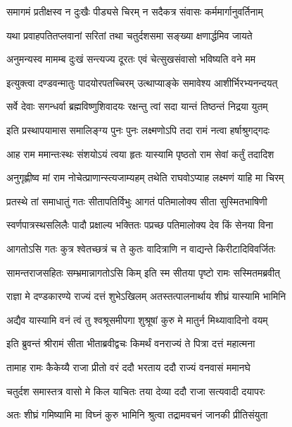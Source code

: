 \twolineshloka
{समागमं प्रतीक्षस्व न दुःखैः पीड्यसे चिरम्}
{न सदैकत्र संवासः कर्ममार्गानुवर्तिनाम्} %

\twolineshloka
{यथा प्रवाहपतितप्लवानां सरितां तथा}
{चतुर्दशसमा सङ्ख्या क्षणार्द्धमिव जायते} %

\twolineshloka
{अनुमन्यस्व मामम्ब दुःखं सन्त्यज्य दूरतः}
{एवं चेत्सुखसंवासो भविष्यति वने मम} %

\twolineshloka
{इत्युक्त्वा दण्डवन्मातुः पादयोरपतच्चिरम्}
{उत्थाप्याङ्के समावेश्य आशीर्भिरभ्यनन्दयत्} %

\twolineshloka
{सर्वे देवाः सगन्धर्वा ब्रह्मविष्णुशिवादयः}
{रक्षन्तु त्वां सदा यान्तं तिष्ठन्तं निद्रया युतम्} %

\twolineshloka
{इति प्रस्थापयामास समालिङ्ग्य पुनः पुनः}
{लक्ष्मणोऽपि तदा रामं नत्वा हर्षाश्रुगद्गदः} %

\twolineshloka
{आह राम ममान्तःस्थः संशयोऽयं त्वया हृतः}
{यास्यामि पृष्ठतो राम सेवां कर्तुं तदादिश} %

\twolineshloka
{अनुगृह्णीष्व मां राम नोचेत्प्राणान्स्त्यजाम्यहम्}
{तथेति राघवोऽप्याह लक्ष्मणं याहि मा चिरम्} %

\twolineshloka
{प्रतस्थे तां समाधातुं गतः सीतापतिर्विभुः}
{आगतं पतिमालोक्य सीता सुस्मितभाषिणी} %

\twolineshloka
{स्वर्णपात्रस्थसलिलैः पादौ प्रक्षाल्य भक्तितः}
{पप्रच्छ पतिमालोक्य देव किं सेनया विना} %

\twolineshloka
{आगतोऽसि गतः कुत्र श्वेतच्छत्रं च ते कुतः}
{वादित्राणि न वाद्यन्ते किरीटादिविवर्जितः} %

\twolineshloka
{सामन्तराजसहितः सम्भ्रमान्नागतोऽसि किम्}
{इति स्म सीतया पृष्टो रामः सस्मितमब्रवीत्} %

\twolineshloka
{राज्ञा मे दण्डकारण्ये राज्यं दत्तं शुभेऽखिलम्}
{अतस्तत्पालनार्थाय शीघ्रं यास्यामि भामिनि} %

\twolineshloka
{अद्यैव यास्यामि वनं त्वं तु श्वश्रूसमीपगा}
{शुश्रूषां कुरु मे मातुर्न मिथ्यावादिनो वयम्} %

\twolineshloka
{इति ब्रुवन्तं श्रीरामं सीता भीताब्रवीद्वचः}
{किमर्थं वनराज्यं ते पित्रा दत्तं महात्मना} %

\twolineshloka
{तामाह रामः कैकेय्यै राजा प्रीतो वरं ददौ}
{भरताय ददौ राज्यं वनवासं ममानघे} %

\twolineshloka
{चतुर्दश समास्तत्र वासो मे किल याचितः}
{तया देव्या ददौ राजा सत्यवादी दयापरः} %

\twolineshloka
{अतः शीघ्रं गमिष्यामि मा विघ्नं कुरु भामिनि}
{श्रुत्वा तद्रामवचनं जानकी प्रीतिसंयुता} %

